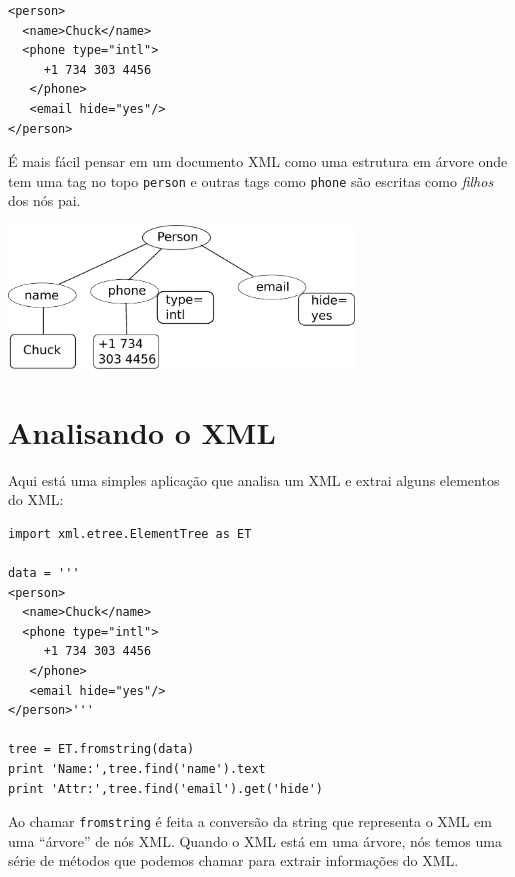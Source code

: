 \beforeverb
\begin{verbatim}
<person>
  <name>Chuck</name>
  <phone type="intl">
     +1 734 303 4456
   </phone>
   <email hide="yes"/>
</person>
\end{verbatim}
\afterverb

É mais fácil pensar em um documento XML como uma estrutura em árvore
onde tem uma tag no topo {\tt person} e outras tags como {\tt phone}
são escritas como \emph{filhos} dos nós pai.

\beforefig
\centerline{\includegraphics[height=1.50in]{figs2/xml-tree.eps}}
\afterfig

\section{Analisando o XML}


Aqui está uma simples aplicação que analisa um XML
e extrai alguns elementos do XML:

\beforeverb
\begin{verbatim}
import xml.etree.ElementTree as ET

data = '''
<person>
  <name>Chuck</name>
  <phone type="intl">
     +1 734 303 4456
   </phone>
   <email hide="yes"/>
</person>'''

tree = ET.fromstring(data)
print 'Name:',tree.find('name').text
print 'Attr:',tree.find('email').get('hide')
\end{verbatim}
\afterverb

Ao chamar {\tt fromstring} é feita a conversão da string que 
representa o XML em uma ``árvore'' de nós XML. Quando o
XML está em uma árvore, nós temos uma série de métodos que
podemos chamar para extrair informações do XML.

